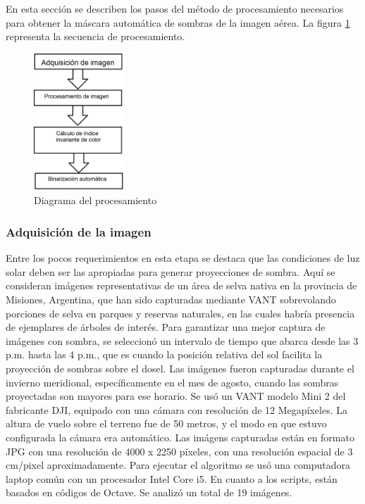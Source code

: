En esta sección se describen los pasos del método de procesamiento necesarios para obtener la máscara automática de sombras de la imagen aérea. La figura \ref{diagrama_procesamiento} representa la secuencia de procesamiento.

\begin{figure}
     \centering
    \includegraphics[width=0.3\textwidth]{Imagenes/flowchart.png}
     \hfill
     \caption{Diagrama del procesamiento}
    \label{diagrama_procesamiento}
\end{figure}

\subsubsection{Adquisición de la imagen}
Entre los pocos requerimientos en esta etapa se destaca que las condiciones de luz solar deben ser las apropiadas para generar proyecciones de sombra. Aquí se consideran imágenes representativas de un área de selva nativa en la provincia de Misiones, Argentina, que han sido capturadas mediante VANT sobrevolando porciones de selva en parques y reservas naturales, en las cuales habría presencia de ejemplares de árboles de interés. Para garantizar una mejor captura de imágenes con sombra, se seleccionó un intervalo de tiempo que abarca desde las 3 p.m. hasta las 4 p.m., que es cuando la posición relativa del sol facilita la proyección de sombras sobre el dosel. Las imágenes fueron capturadas durante el invierno meridional, específicamente en el mes de agosto, cuando las sombras proyectadas son mayores para ese horario. Se usó un VANT modelo Mini 2 del fabricante DJI, equipado con una cámara con resolución de 12 Megapíxeles. La altura de vuelo sobre el terreno fue de 50 metros, y el modo en que estuvo configurada la cámara era automático. Las imágens capturadas están en formato JPG con una resolución de 4000 x 2250 píxeles, con una resolución espacial de 3 cm/pixel aproximadamente. Para ejecutar el algoritmo se usó una computadora laptop común con un procesador Intel Core i5. En cuanto a los scripts, están basados en códigos de Octave. Se analizó un total de 19 imágenes.

